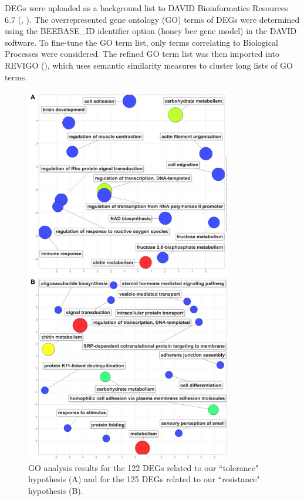 \documentclass[11pt,a4paper,oldfontcommands,openany]{memoir}
\numberwithin{equation}{section} %
\begin{document}
DEGs were uploaded as a background list to DAVID Bioinformatics Resources 6.7 (\citealt{davidBio}, \citealt{davidBio2}). The overrepresented gene ontology (GO) terms of DEGs were determined using the BEEBASE\_ID identifier option (honey bee gene model) in the DAVID software. To fine-tune the GO term list, only terms correlating to Biological Processes were considered. The refined GO term list was then imported into REVIGO (\citealt{revigo}), which uses semantic similarity measures to cluster long lists of GO terms.

\begin{figure}[H]
  \centering
  \begin{framed}
  \includegraphics[width=0.8\textwidth]{Images/revigo}
  \end{framed}
  \caption{GO analysis results for the 122 DEGs related to our ``tolerance" hypothesis (A) and for the 125 DEGs related to our ``resistance" hypothesis (B).}
  \label{fig:revigo}
\end{figure}
\end{document}
